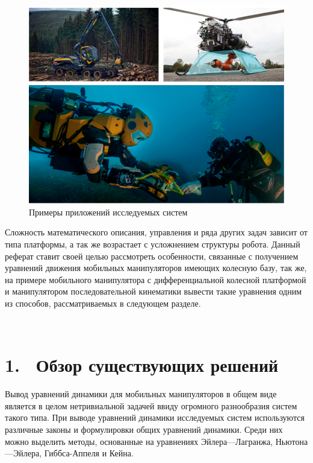 \documentclass[14pt, a4paper]{extreport}
\begin{document}
\newpage
\begin{figure}[!h]
\centering
\captionsetup{justification=centering}
\renewcommand{\figurename}{Рисунок}
\includegraphics[width=1\textwidth]{big_mm2.jpeg}	%
\caption{Примеры приложений исследуемых систем}
\label{pic:4}
\end{figure}


Сложность математического описания, управления и ряда других задач зависит от типа платформы, а так же возрастает с усложнением структуры робота. Данный реферат ставит своей целью рассмотреть особенности, связанные с получением уравнений движения мобильных манипуляторов имеющих колесную базу, так же, на примере мобильного манипулятора с дифференциальной колесной платформой и манипулятором последовательной кинематики вывести такие уравнения одним из способов, рассматриваемых в следующем разделе.
\newpage

\ \\
\hypertarget{sec:1}{}
\section*{1. \ Обзор существующих решений}

Вывод уравнений динамики для мобильных манипуляторов в общем виде является в целом нетривиальной задачей ввиду огромного разнообразия систем такого типа. При выводе уравнений динамики исследуемых систем используются различные законы и формулировки общих уравнений динамики. Среди них можно выделить методы, основанные на уравнениях Эйлера---Лаг­ранжа, Ньютона---Эйлера, Гиббса-Аппеля и Кейна.
\end{document}
